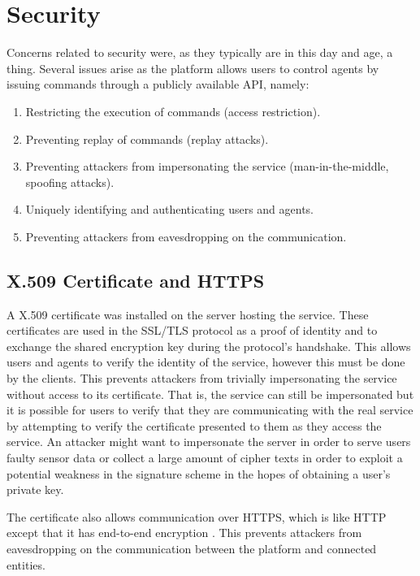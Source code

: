 \section{Security}
Concerns related to security were, as they typically are in this day and age, a thing.
Several issues arise as the platform allows users to control agents by issuing commands through a publicly available API, namely:

\begin{enumerate}
	\item Restricting the execution of commands (access restriction).
	\item Preventing replay of commands (replay attacks).
	\item Preventing attackers from impersonating the service (man-in-the-middle, spoofing attacks).
	\item Uniquely identifying and authenticating users and agents.
	\item Preventing attackers from eavesdropping on the communication.
\end{enumerate}

\subsection{X.509 Certificate and HTTPS}
A X.509 certificate \citep[section 3.1]{rfca} was installed on the server hosting the service.
These certificates are used in the SSL/TLS protocol as a proof of identity and to exchange the shared encryption key during the protocol's handshake.
This allows users and agents to verify the identity of the service, however this must be done by the clients.
This prevents attackers from trivially impersonating the service without access to its certificate.
That is, the service can still be impersonated but it is possible for users to verify that they are communicating with the real service by attempting to verify the certificate presented to them as they access the service.
An attacker might want to impersonate the server in order to serve users faulty sensor data or collect a large amount of cipher texts in order to exploit a potential weakness in the signature scheme in the hopes of obtaining a user's private key.

The certificate also allows communication over HTTPS, which is like HTTP except that it has end-to-end encryption \citep{rfc-https}.
This prevents attackers from eavesdropping on the communication between the platform and connected entities.

